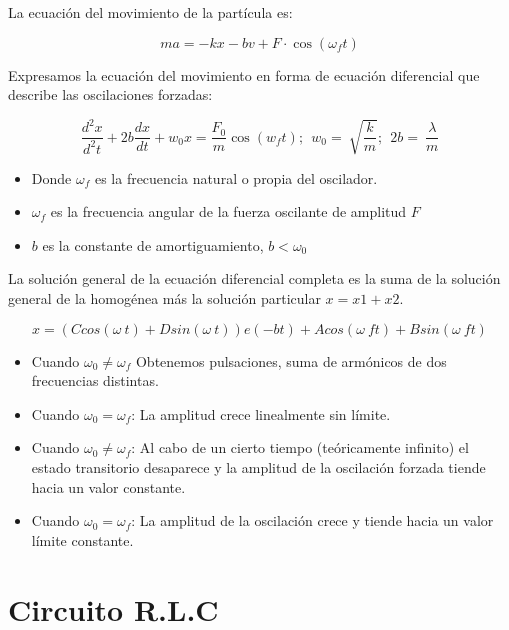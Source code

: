 \documentclass[11pt]{article}
\begin{document}
\begin{multicols}{2}
\begin{itemize}
		\end{itemize}

		La ecuación del movimiento de la partícula es:

		$$ma = -kx-bv+F \cdot \cos(\omega _ft)$$

		Expresamos la ecuación del movimiento en forma de ecuación diferencial que describe las oscilaciones forzadas:

		$$\frac{d^2x}{d^2t}+2b\frac{dx}{dt}+w_0x=\frac{F_0}{m}\cos{\left(w_ft\right);\ \ w_0=\ \sqrt{\frac{k}{m}}};\ \ 2b=\ \frac{\lambda}{m}$$

		\begin{itemize}

			\item Donde $\omega _f$ es la frecuencia natural o propia del oscilador.
			\item $\omega _f$ es la frecuencia angular de la fuerza oscilante de amplitud $F$
			\item $b$ es la constante de amortiguamiento, $b < \omega _0$

		\end{itemize}

		La solución general de la ecuación diferencial completa es la suma de la solución general de la homogénea más la solución particular $x = x1 + x2$.

		$$x=(Ccos(\omega\ t)+Dsin(\omega\ t))e(-bt)+Acos(\omega\ ft)+Bsin(\omega\ ft)$$

		\begin{itemize}

			\item Cuando $\omega _0 \not= \omega _f$ Obtenemos pulsaciones, suma de armónicos de dos frecuencias distintas.
			\item Cuando $\omega _0 = \omega _f$: La amplitud crece linealmente sin límite.
			\item Cuando $\omega _0 \not= \omega _f$: Al cabo de un cierto tiempo (teóricamente infinito) el estado transitorio desaparece y la amplitud de la oscilación forzada tiende hacia un valor constante.
			\item Cuando $\omega _0 = \omega _f$: La amplitud de la oscilación crece y tiende hacia un valor límite constante.

		\end{itemize}






\section{Circuito R.L.C}


\end{multicols}
\end{document}
